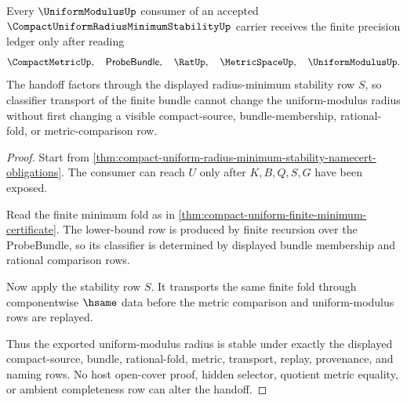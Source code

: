 \begin{theorem}
\label{thm:compact-uniform-radius-minimum-stability-uniform-modulus-handoff}
Every $\UniformModulusUp$ consumer of an accepted $\CompactUniformRadiusMinimumStabilityUp$ carrier receives the finite precision ledger only after reading
$$
\CompactMetricUp,\quad
\mathsf{ProbeBundle},\quad
\RatUp,\quad
\MetricSpaceUp,\quad
\UniformModulusUp .
$$
The handoff factors through the displayed radius-minimum stability row $S$, so classifier transport of the finite bundle cannot change the uniform-modulus radius without first changing a visible compact-source, bundle-membership, rational-fold, or metric-comparison row.
\end{theorem}
\begin{proof}
Start from \autoref{thm:compact-uniform-radius-minimum-stability-namecert-obligations}. The consumer can reach $U$ only after $K,B,Q,S,G$ have been exposed.

Read the finite minimum fold as in \autoref{thm:compact-uniform-finite-minimum-certificate}. The lower-bound row is produced by finite recursion over the ProbeBundle, so its classifier is determined by displayed bundle membership and rational comparison rows.

Now apply the stability row $S$. It transports the same finite fold through componentwise $\hsame$ data before the metric comparison and uniform-modulus rows are replayed.

Thus the exported uniform-modulus radius is stable under exactly the displayed compact-source, bundle, rational-fold, metric, transport, replay, provenance, and naming rows. No host open-cover proof, hidden selector, quotient metric equality, or ambient completeness row can alter the handoff.
\end{proof}



